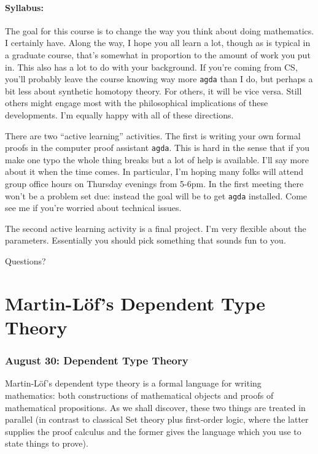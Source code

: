 \documentclass{amsart}
\theoremstyle{theorem}
\theoremstyle{definition}
\theoremstyle{remark}
\newcommand{\0}{\mathbbe{0}}
\newcommand{\1}{\mathbbe{1}}
\newcommand{\2}{\mathbbe{2}}
\newcommand{\3}{\mathbbe{3}}
\newcommand{\4}{\mathbbe{4}}
\begin{document}
\subsection*{Syllabus:}
The goal for this course is to change the way you think about doing mathematics. I certainly have. Along the way, I hope you all learn a lot, though as is typical in a graduate course, that's somewhat in proportion to the amount of work you put in. This also has a lot to do with your background. If you're coming from CS, you'll probably leave the course knowing way more \texttt{agda} than I do, but perhaps a bit less about synthetic homotopy theory. For others, it will be vice versa. Still others might engage most with the philosophical implications of these developments. I'm equally happy with all of these directions. 

There are two ``active learning'' activities. The first is writing your own formal proofs in the computer proof assistant \texttt{agda}. This is hard in the sense that if you make one typo the whole thing breaks but a lot of help is available. I'll say more about it when the time comes. In particular, I'm hoping many folks will attend group office hours on Thursday evenings from 5-6pm. In the first meeting there won't be a problem set due: instead the goal will be to get \texttt{agda} installed. Come see me if you're worried about technical issues.

The second active learning activity is a final project. I'm very flexible about the parameters. Essentially you should pick something that sounds fun to you.

Questions?
\fi

\part{Martin-L\"of's Dependent Type Theory}


\section*{August 30: Dependent Type Theory}

Martin-L\"{o}f's dependent type theory is a formal language for writing mathematics: both constructions of mathematical objects and proofs of mathematical propositions. As we shall discover, these two things are treated in parallel (in contrast to classical Set theory plus first-order logic, where the latter supplies the proof calculus and the former gives the language which you use to state things to prove).
\end{document}

